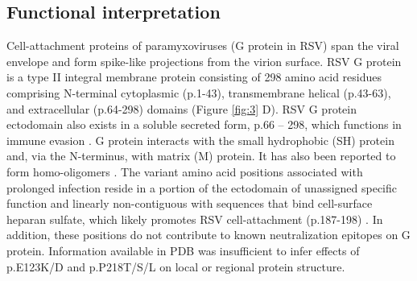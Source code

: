 \documentclass{article} %
\begin{document}
\subsection{Functional interpretation}
Cell-attachment proteins of paramyxoviruses (G protein in RSV) span the viral envelope and form spike-like projections from the virion surface. 
RSV G protein is a type II integral membrane protein consisting of 298 amino acid residues comprising N-terminal cytoplasmic (p.1-43), transmembrane helical (p.43-63), and extracellular (p.64-298) domains 
(Figure \ref{fig:3} D). 
RSV G protein ectodomain also exists in a soluble secreted form, p.66 – 298, which functions in immune evasion 
\citep{levine1987demonstration, feldman1999identification, feldman2000fusion}.
G protein interacts with the small hydrophobic (SH) protein 
\citep{rixon2005respiratory}
and, via the N-terminus, with matrix (M) 
\citep{ghildyal2005interaction} 
protein.
It has also been reported to form homo-oligomers 
\citep{collins1992oligomerization}.
The variant amino acid positions associated with prolonged infection reside in a portion of the ectodomain of unassigned specific function and linearly non-contiguous with sequences that bind cell-surface heparan sulfate, which likely promotes RSV cell-attachment (p.187-198)
\citep{levine1987demonstration, feldman1999identification, feldman2000fusion}.
In addition, these positions do not contribute to known neutralization epitopes on G protein. Information available in PDB was insufficient to infer effects of p.E123K/D and p.P218T/S/L on local or regional protein structure. 
\end{document}
